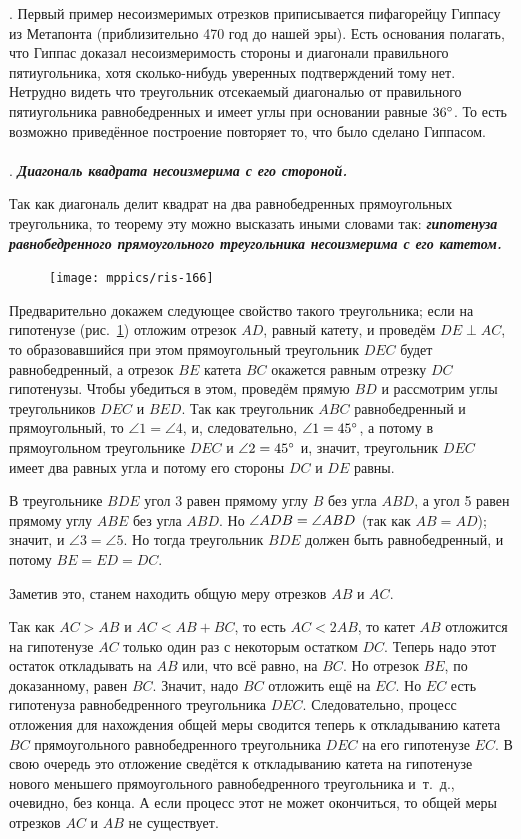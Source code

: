 \documentclass[oneside]{book}
\begin{document}
\smallskip
{.}
Первый пример несоизмеримых отрезков приписывается пифагорейцу Гиппасу из Метапонта (приблизительно 470 год до нашей эры).
Есть основания полагать, что Гиппас доказал несоизмеримость стороны и диагонали правильного пятиугольника, хотя сколько-нибудь уверенных подтверждений тому нет.
Нетрудно видеть что треугольник отсекаемый диагональю от правильного пятиугольника равнобедренных и имеет углы при основании равные $36\degree$.
То есть возможно приведённое построение повторяет то, что было сделано Гиппасом.


\paragraph{}\label{1938/149}
.
\textbf{\emph{Диагональ квадрата несоизмерима с его стороной.}}

Так как диагональ делит квадрат на два равнобедренных прямоугольных треугольника, то теорему эту можно высказать иными словами так:
\textbf{\emph{гипотенуза равнобедренного прямоугольного треугольника несоизмерима с его катетом.}}

\begin{figure}
\centering
\texttt{[image: mppics/ris-166]}
\caption{}\label{1938/ris-166}
\end{figure}

Предварительно докажем следующее свойство такого треугольника;
если на гипотенузе (рис.~\ref{1938/ris-166}) отложим отрезок $AD$, равный катету, и проведём $DE\perp AC$, то образовавшийся при этом прямоугольный треугольник $DEC$ будет равнобедренный, а отрезок $BE$ катета $BC$ окажется равным отрезку $DC$ гипотенузы.
Чтобы убедиться в этом, проведём прямую $BD$ и рассмотрим углы треугольников $DEC$ и $BED$.
Так как треугольник $ABC$ равнобедренный и прямоугольный, то $\angle 1 = \angle 4$, и, следовательно, $\angle 1 \z= 45\degree$, а потому в прямоугольном треугольнике $DEC$ и $\angle 2 = 45\degree$ и, значит, треугольник $DEC$ имеет два равных угла и потому его стороны $DC$ и $DE$ равны.

В треугольнике $BDE$ угол 3 равен прямому углу $B$ без угла $ABD$, а угол 5 равен прямому углу $ABE$ без угла $ABD$.
Но $\angle ADB \z= \angle ABD$ (так как $AB=AD$);
значит, и $\angle 3 = \angle 5$.
Но тогда треугольник $BDE$ должен быть равнобедренный, и потому $BE=ED=DC$.

Заметив это, станем находить общую меру отрезков $AB$ и $AC$.

Так как $AC>AB$ и $AC<AB+BC$, то есть
$AC<2AB$, то катет $AB$ отложится на гипотенузе $AC$ только один раз с некоторым остатком $DC$.
Теперь надо этот остаток откладывать на $AB$ или, что всё равно, на $BC$.
Но отрезок $BE$, по доказанному, равен $BC$.
Значит, надо $BC$ отложить ещё на $EC$.
Но $EC$ есть гипотенуза равнобедренного треугольника $DEC$.
Следовательно, процесс отложения для нахождения общей меры сводится теперь к откладыванию катета $BC$ прямоугольного равнобедренного треугольника $DEC$ на его гипотенузе $EC$.
В свою очередь это отложение сведётся к откладыванию катета на гипотенузе нового меньшего прямоугольного равнобедренного треугольника и~т.~д., очевидно, без конца.
А если процесс этот не может окончиться, то общей меры отрезков $AC$ и $AB$ не существует.
\end{document}
